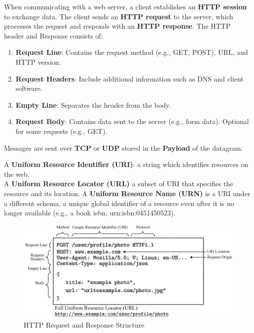 \begin{Def}

    When communicating with a web server, a client establishes an \textbf{HTTP session} to exchange data.
    The client sends an \textbf{HTTP request} to the server, which processes the request and responds with an \textbf{HTTP response}.
    The HTTP header and Response consists of:
    \begin{enumerate}
        \item \textbf{Request Line}: Contains the request method (e.g., GET, POST), URL, and HTTP version.
        \item \textbf{Request Headers}: Include additional information such as DNS and client software.
        \item \textbf{Empty Line}: Separates the header from the body.
        \item \textbf{Request Body}: Contains data sent to the server (e.g., form data). Optional for some requests (e.g., GET). 
    \end{enumerate}

    \noindent
    Messages are sent over \textbf{TCP} or \textbf{UDP} stored in the \textbf{Payload} of the datagram. \hfill \cite{fielding_http_1999}
\end{Def}

\begin{Def}

    A \textbf{Uniform Resource Identifier (URI)}: a string which identifies resources on the web.\\
    A \textbf{Uniform Resource Locator (URL)} a subset of URI that specifies the resource and its location.
    A \textbf{Uniform Resource Name (URN)} is a URI under a different schema, a unique global 
    identifier of a resource even after it is no longer available (e.g., a book isbn, urn:isbn:0451450523). \hfill \cite{berners_lee_uri_2005}
\end{Def} 

\begin{figure}[h!]
    \hspace{-2.5em}
    \includegraphics[width=1\textwidth]{Sections/network/httpheader.png}
    \caption{HTTP Request and Response Structure}
    \label{fig:http}
\end{figure}

